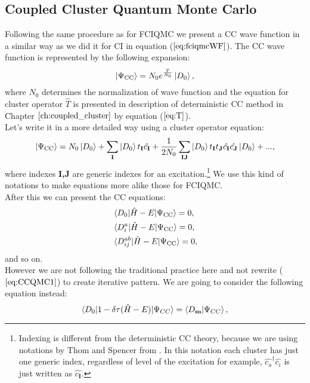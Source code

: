 \documentclass[twoside,english]{uiofysmaster}
\theoremstyle{definition}
\begin{document}
\subsection{Coupled Cluster Quantum Monte Carlo}\label{sec:CCQMC}
Following the same procedure as for FCIQMC we present a CC wave function in a similar way as we did it for CI in equation ($\ref{eq:fciqmcWF}$). The CC wave function is represented by the following expansion:
\begin{equation}\label{eq:ccqmcWF}
\ket{\Psi_{\text{CC}}}= N_0 e^{\frac{\hat{T}}{N_0}}\ket{D_0},
\end{equation}
where $N_0$ determines the normalization of wave function and the equation for cluster operator $\hat{T}$ is presented in description of deterministic CC method in Chapter $\ref{ch:coupled_cluster}$ by equation ($\ref{eq:T}$). \\
Let's write it in a more detailed way using a cluster operator equation:
\begin{align}
\ket{\Psi_{\text{CC}}}=N_0\ket{D_0} + \sum_{\textbf{I}} \ket{D_0} t_\textbf{I} \hat{c_\textbf{I}} + \frac{1}{2N_0}
 \sum_{\textbf{IJ}} \ket{D_0} t_\textbf{I} t_\textbf{J}\hat{c_\textbf{I}} \hat{c_\textbf{J}}\ket{D_0} + ...,
\end{align}
where indexes \textbf{I,J} are generic indexes for an excitation.\footnote{Indexing is different from the deterministic CC theory, because we are using notations by Thom and Spencer from \cite{spencerDevelopmentsStochasticCoupled2016}. In this notation each cluster has just one generic index, regardless of level of the excitation for example, $ \hat{c_a}^\dagger \hat{c_i}$ is just written as $\hat{c_\textbf{I}}$.} We use this kind of notations to make equations more alike those for FCIQMC.\\ 
After this we can present the CC equations:
\begin{align}\label{eq:CCQMC1}
&\braket{D_0|\hat{H}-E|\Psi_{\text{CC}}}=0,\\
&\braket{D_i^a|\hat{H}-E|\Psi_{\text{CC}}}=0,\\
&\braket{D_{ij}^{ab}|\hat{H}-E|\Psi_{\text{CC}}}=0,\\
\end{align} 
and so on.\\
However we are not following the traditional practice here and not rewrite ($\ref{eq:CCQMC1}$) to create iterative pattern. We are going to consider the following equation instead: 
\begin{equation}\label{eq::CCQMCproj}
\braket{D_0|1-\delta \tau (\hat{H}-E)|\Psi_{CC}}=\braket{D_\textbf{m}|\Psi_{CC}},
\end{equation}
\end{document}
